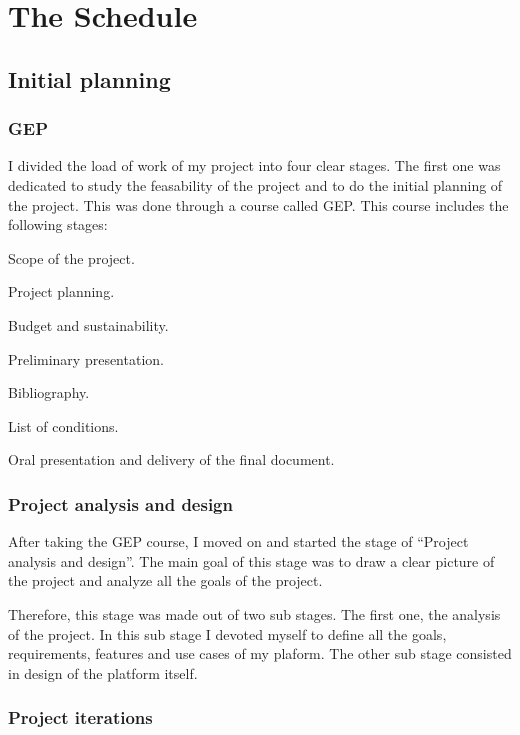  
\section{The Schedule}

\subsection{Initial planning}

\subsubsection*{GEP}
\label{sec:gep}

I divided the load of work of my project into four clear stages. The first one
was dedicated to study the feasability of the project and to do the initial
planning of the project. This was done through a course called GEP. This course
includes the following stages:

\mylist
  \item Scope of the project.
  \item Project planning.
  \item Budget and sustainability.
  \item Preliminary presentation.
  \item Bibliography.
  \item List of conditions.
  \item Oral presentation and delivery of the final document.
\mylistend

\subsubsection*{Project analysis and design}

After taking the GEP course, I moved on and started the stage of ``Project
analysis and design''. The main goal of this stage was to draw a clear picture
of the project and analyze all the goals of the project.

Therefore, this stage was made out of two sub stages. The first one, the
analysis of the project. In this sub stage I devoted myself to define all
the goals, requirements, features and use cases of my plaform. The other sub
stage consisted in design of the platform itself.

\subsubsection*{Project iterations}

